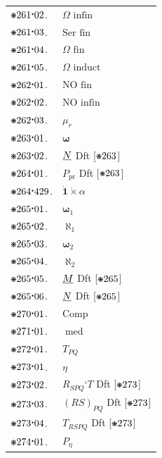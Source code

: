 \documentclass[12pt,openany,leqno,twocolumn]{book}
\newcommand{\pmast}{\text{\resizebox{!}{.75\height}{\ding{107}}}} %
\newcommand{\pmcdot}{\text{\raisebox{.05cm}{$\boldsymbol\cdot$}}} %
\newcommand{\pmcirc}[1]{\mathbf{\dot{\text{$#1$}}}}
\newcommand{\pmaleph}{\boldsymbol{\aleph}} %
\newcommand{\pmrn}[1]{\pmcirc{#1}} %
\newcommand{\pmrnprod}[2]{#1 \mathrel{\pmcirc{\times}} #2} %
\newcommand{\pmword}{\Omega} %
\newcommand{\pmm}{\emph{M}} %
\newcommand{\pmn}{\emph{N}} %
\newcommand{\pmwordinf}{\pmword\text{ infin}} %
\newcommand{\pmserfin}{\text{Ser fin}} %
\newcommand{\pmwordfin}{\pmword\text{ fin}} %
\newcommand{\pmwordind}{\pmword\text{ induct}} %
\newcommand{\pmordnfin}{\text{NO fin}} %
\newcommand{\pmordninf}{\text{NO infin}} %
\newcommand{\pmfinord}[1]{#1_r} %
\newcommand{\pmom}{\boldsymbol{\omega}} %
\newcommand{\pmpr}[1]{#1_{\text{pr}}} %
\newcommand{\pmomn}[1]{\pmom_{#1}} %
\newcommand{\pmalephn}[1]{\pmaleph_{#1}} %
\newcommand{\pmComp}{\text{Comp}}
\newcommand{\pmmed}{\mathrel{\text{med}}} %
\newcommand{\pmsimp}[3]{\mathrel{#1_{#2#3}}} %
\newcommand{\pmsimps}[3]{{#1}_{#2}\textbf{`}{#3}} %
\newcommand{\pmSimp}[3]{({#1}{#2})_{#3}} %
\newcommand{\pmSimps}[2]{{#1}_{#2}} %
\newcommand{\pmrats}{\eta} %
\newcommand{\pmsfcls}[1]{#1_\pmrats} %
\begin{document}
\begin{tabular}{l l}
	$\pmast261\pmcdot02$. & $\pmwordinf$ \\
	$\pmast261\pmcdot03$. & $\pmserfin$ \\
	$\pmast261\pmcdot04$. & $\pmwordfin$ \\
	$\pmast261\pmcdot05$. & $\pmwordind$ \\
	$\pmast262\pmcdot01$. & $\pmordnfin$ \\
	$\pmast262\pmcdot02$. & $\pmordninf$ \\
	$\pmast262\pmcdot03$. & $\pmfinord{\mu}$ \\
	$\pmast263\pmcdot01$. & $\pmom$ \\
	$\pmast263\pmcdot02$. & $\pmn$ \hspace{3.4ex} Dft [\(\pmast263\)] \\
	$\pmast264\pmcdot01$. & $\pmpr{P}$ \hspace{2ex} Dft [\(\pmast263\)] \\
	$\pmast264\pmcdot429$. & $\pmrnprod{\pmrn{1}}{\alpha}$ \\
	$\pmast265\pmcdot01$. & $\pmomn{1}$ \\
	$\pmast265\pmcdot02$. & $\pmalephn{1}$ \\
	$\pmast265\pmcdot03$. & $\pmomn{2}$ \\
	$\pmast265\pmcdot04$. & $\pmalephn{2}$ \\
	$\pmast265\pmcdot05$. & $\pmm$ \hspace{3.2ex} Dft [\(\pmast265\)] \\
	$\pmast265\pmcdot06$. & $\pmn$ \hspace{3.5ex} Dft [\(\pmast265\)] \\
	$\pmast270\pmcdot01$. & $\pmComp$ \\
	$\pmast271\pmcdot01$. & $\pmmed$ \\
	$\pmast272\pmcdot01$. & $\pmsimp{T}{P}{Q}$ \\
	$\pmast273\pmcdot01$. & $\pmrats$ \\
	$\pmast273\pmcdot02$. & $\pmsimps{R}{SPQ}{T}$ \hspace{3.4ex} Dft [\(\pmast273\)] \\
	$\pmast273\pmcdot03$. & $\pmSimp{R}{S}{PQ}$ \hspace{3.5ex} Dft [\(\pmast273\)] \\
	$\pmast273\pmcdot04$. & $\pmSimps{T}{RSPQ}$ \hspace{4.9ex} Dft [\(\pmast273\)] \\
	$\pmast274\pmcdot01$. & $\pmsfcls{P}$ \\

\end{tabular}
\end{document}
